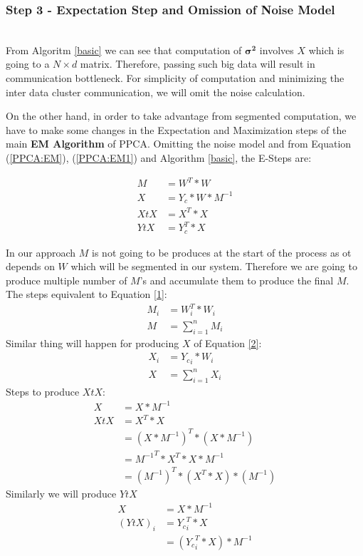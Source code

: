 \documentclass[10pt,conference,letterpaper]{IEEEtran}
\begin{document}
\subsubsection{\textbf{Step 3 - Expectation Step and Omission of Noise Model}}\hspace*{\fill} \\
From Algoritm \ref{basic} we can see that computation of $\pmb{\sigma ^2}$ involves $X$ which is going to a $N \times d$ matrix. Therefore, passing such big data will result in communication bottleneck. For simplicity of computation and minimizing the inter data cluster communication, we will omit the noise calculation. 

On the other hand, in order to take advantage from segmented computation, we have to make some changes in the Expectation and Maximization steps of the main \textbf{EM Algorithm} of PPCA. 
Omitting the noise model and from Equation (\ref{PPCA:EM}), (\ref{PPCA:EM1}) and Algorithm \ref{basic}, the E-Steps are:

\begin{align}
\label{1}
M &= W^T * W\\
\label{2}
X &= Y_c * W * M^{-1}\\
\label{3}
XtX &= X^T * X\\
\label{4}
YtX &= Y_c^T * X
\end{align}

In our approach $M$ is not going to be produces at the start of the process as ot depends on $W$ which will be segmented in our system. Therefore we are going to produce multiple number of $M$'s and accumulate them to produce the final $M$. The steps equivalent to Equation \ref{1}: 
\begin{align}
\label{5}
M_i &= W_i^T * W_i \\
\label{6}
M &= \sum^n_{i = 1} M_i
\end{align}
Similar thing will happen for producing $X$ of Equation \ref{2}:
\begin{align}
\label{7}
X_i &= {Y_c}_i * W_i\\
\label{8}
X &= \sum^n_{i = 1} X_i
\end{align}
Steps to produce $XtX$:
\begin{align*}
    X   &= X * M^{-1}\\
    XtX &= X^T * X\\
        &= (X * M^{-1})^T*(X * M^{-1})\\
        &= {M^{-1}}^T*X^T*X*M^{-1}\\
        &= {(M^{-1})}^T*(X^T*X)*(M^{-1})
\end{align*}
Similarly we will produce $YtX$
\begin{align*}
    X   &= X * M^{-1}\\
    (YtX)_i &= {Y_c}_i^T * X\\
        &= ({Y_c}_i^T * X) * M^{-1} 
\end{align*}
\end{document}

